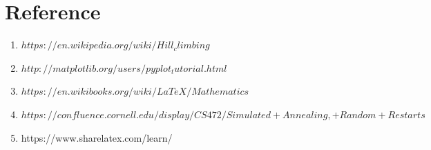 \documentclass[a4paper]{article}
\begin{document}
\section{Reference}
\begin{enumerate}
  \item $https://en.wikipedia.org/wiki/Hill_climbing$
  \item $http://matplotlib.org/users/pyplot_tutorial.html$
  \item $https://en.wikibooks.org/wiki/LaTeX/Mathematics$
  \item $https://confluence.cornell.edu/display/CS472/Simulated+Annealing,+Random+Restarts$
  \item https://www.sharelatex.com/learn/
\end{enumerate}
\end{document}
